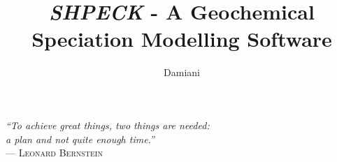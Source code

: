 \documentclass[ppgc,mestrado,English]{iiufrgs}
\title{\emph{SHPECK} - A Geochemical Speciation Modelling Software}
\author{Damiani}{Leonardo Hax}
\begin{document}
	
\renewcommand{\lstlistingname}{Code}

\maketitle

\clearpage
\begin{flushright}
\mbox{}\vfill
{\sffamily\itshape
``To achieve great things, two things are needed:\\
 a plan and not quite enough time.''\\}
--- \textsc{Leonard Bernstein}
\end{flushright}

\renewcommand*\bibname{References}

\renewcommand*\contentsname{Summary}
\tableofcontents

\end{document}
